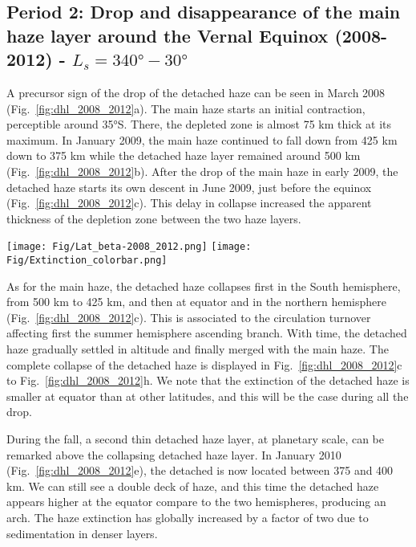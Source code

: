 \subsection{Period 2: Drop and disappearance of the main haze layer around the Vernal Equinox (2008-2012) - $L_s=\ang{340}-\ang{30}$}

A precursor sign of the drop of the detached haze can be seen in March 2008 (Fig.~\ref{fig:dhl_2008_2012}a).
The main haze starts an initial contraction, perceptible around \ang{35}S. There, the depleted zone is almost
75 km thick at its maximum. In January 2009, the main haze continued to fall down from 425 km down to 375 km
while the detached haze layer remained around 500 km (Fig.~\ref{fig:dhl_2008_2012}b). After the drop
of the main haze in early 2009, the detached haze starts its own descent in June 2009, just before the equinox
(Fig.~\ref{fig:dhl_2008_2012}c). This delay in collapse increased the apparent thickness of the depletion
zone between the two haze layers.

\begin{figure*}[!ht]
    \centering
    \texttt{[image: Fig/Lat\_beta-2008\_2012.png]}
    \texttt{[image: Fig/Extinction\_colorbar.png]}\vspace{-.3cm}
    \caption{Same as the figure~\ref{fig:dhl_2004_2008} for 8 images taken between 2008 and 2012
    ($L_s=\ang{340}-\ang{30}$) showing the drop and disappearance of the DHL.
    The color schema extent is kept similar to the figure~\ref{fig:dhl_2004_2008} to provide
    direct comparisons but the altitude range is extended down to 300 km around the UV3 saturation
    level (where the atmosphere is opaque).}
    \label{fig:dhl_2008_2012}
\end{figure*}

As for the main haze, the detached haze collapses first in the South hemisphere, from 500 km to 425 km, and
then at equator and in the northern hemisphere (Fig.~\ref{fig:dhl_2008_2012}c).
This is associated to the circulation turnover affecting first the summer hemisphere ascending branch.
With time, the detached haze gradually settled in altitude and finally merged with
the main haze. The complete collapse of the detached haze is displayed in Fig.~\ref{fig:dhl_2008_2012}c to
Fig.~\ref{fig:dhl_2008_2012}h. We note that the extinction of the detached haze is smaller at equator than at
other latitudes, and this will be the case during all the drop.

During the fall, a second thin detached haze layer, at planetary scale, can be remarked above the collapsing detached
haze layer. In January 2010 (Fig.~\ref{fig:dhl_2008_2012}e), the detached is now located between 375 and 400 km.
We can still see a double deck of haze, and this time the detached haze appears higher at the equator compare to the two
hemispheres, producing an arch. The haze extinction has globally increased by a factor of two due to sedimentation
in denser layers.

